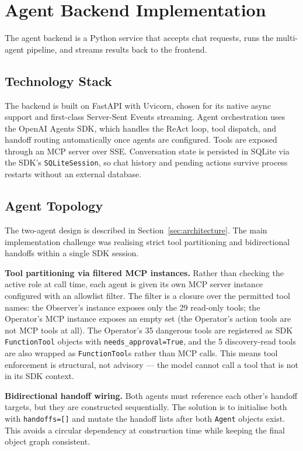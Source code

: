 \section{Agent Backend Implementation}
\label{sec:agent-backend}

The agent backend is a Python service that accepts chat requests, runs the multi-agent pipeline, and streams results back to the frontend.

\subsection{Technology Stack}

The backend is built on FastAPI with Uvicorn, chosen for its native async support and first-class Server-Sent Events streaming. Agent orchestration uses the OpenAI Agents SDK, which handles the ReAct loop, tool dispatch, and handoff routing automatically once agents are configured. Tools are exposed through an MCP server over SSE. Conversation state is persisted in SQLite via the SDK's \texttt{SQLiteSession}, so chat history and pending actions survive process restarts without an external database.

\subsection{Agent Topology}
\label{sec:agent-topology-impl}

The two-agent design is described in Section~\ref{sec:architecture}. The main implementation challenge was realising strict tool partitioning and bidirectional handoffs within a single SDK session.

\textbf{Tool partitioning via filtered MCP instances.} Rather than checking the active role at call time, each agent is given its own MCP server instance configured with an allowlist filter. The filter is a closure over the permitted tool names: the Observer's instance exposes only the 29 read-only tools; the Operator's MCP instance exposes an empty set (the Operator's action tools are not MCP tools at all). The Operator's 35 dangerous tools are registered as SDK \texttt{FunctionTool} objects with \texttt{needs\_approval=True}, and the 5 discovery-read tools are also wrapped as \texttt{FunctionTool}s rather than MCP calls. This means tool enforcement is structural, not advisory — the model cannot call a tool that is not in its SDK context.

\textbf{Bidirectional handoff wiring.} Both agents must reference each other's handoff targets, but they are constructed sequentially. The solution is to initialise both with \texttt{handoffs=[]} and mutate the handoff lists after both \texttt{Agent} objects exist. This avoids a circular dependency at construction time while keeping the final object graph consistent.

